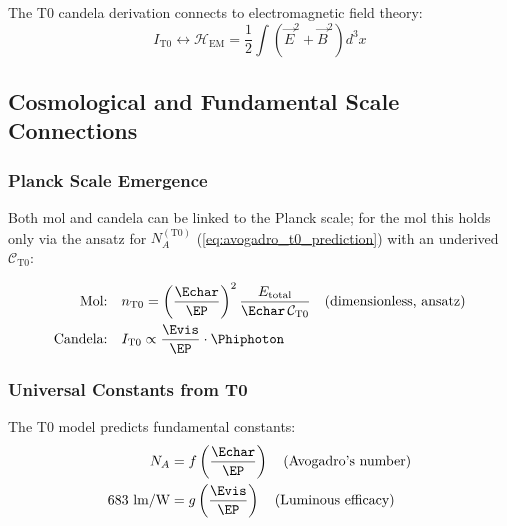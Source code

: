 The T0 candela derivation connects to electromagnetic field theory:
\begin{equation}
	I_{\text{T0}} \leftrightarrow \mathcal{H}_{\text{EM}} = \frac{1}{2}\int (\vec{E}^2 + \vec{B}^2) d^3x
	\label{eq:candela_em_connection}
\end{equation}

\subsection{Cosmological and Fundamental Scale Connections}
\label{subsec:cosmological_connections}

\subsubsection{Planck Scale Emergence}
\label{subsubsec:planck_scale_emergence}

Both mol and candela can be linked to the Planck scale; for the mol this holds only via the ansatz for $N_A^{(\text{T0})}$ (\cref{eq:avogadro_t0_prediction}) with an underived $\mathcal{C}_{\text{T0}}$:

\begin{align}
	\text{Mol:} \quad &n_{\text{T0}} = \left(\frac{\Echar}{\EP}\right)^2 \frac{E_{\text{total}}}{\Echar\,\mathcal{C}_{\text{T0}}} \quad \text{(dimensionless, ansatz)} \\
	\text{Candela:} \quad &I_{\text{T0}} \propto \frac{\Evis}{\EP} \cdot \Phiphoton
\end{align}

\subsubsection{Universal Constants from T0}
\label{subsubsec:universal_constants_t0}

The T0 model predicts fundamental constants:
\begin{align}
	N_A &= f\left(\frac{\Echar}{\EP}\right) \quad \text{(Avogadro's number)} \\
	683 \text{ lm/W} &= g\left(\frac{\Evis}{\EP}\right) \quad \text{(Luminous efficacy)}
\end{align}
